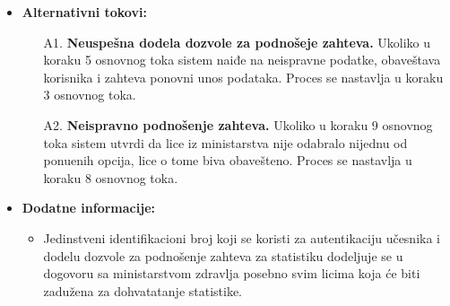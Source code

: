 \documentclass[titlepage]{article}
\begin{document}
\begin{itemize}
\begin{enumerate}
\begin{itemize}
                    \item Dohvatanje statistike o broju vakcinisanih Sputnik V vakcinom u odre\dj{}enom vremenskom periodu.
                    \item Dohvatanje statistike o broju vakcinisanih Sinopharm vakcinom u odre\dj{}enom vremenskom periodu.
                    \item Dohvatanje statistike o broju vakcinisanih Oxford/AstraZeneca vakcinom u odre\dj{}enom vremenskom periodu.
                    \item Dohvatanje statistike o broju testiranih na COVID-19 u odre\dj{}enom vremenskom periodu.
                    \item Dohvatanje statistike o broju osoba sa pozitivnim testom na \newline COVID-19 u odre\dj{}enom vremenskom periodu.
                    \item Dohvatanje informacija (vreme, identitet lica iz ministarstva) o prethodnim potra\v{z}ivanjima iz ministarstva zdravlja.
                \end{itemize}
    \item Sistem proverava da li je uspe\v{s}no izabrana neka od opcija.
    \item Sistem na osnovu izbora dostavlja statistiku licu iz ministartstva zdravlja.
    \item Informacije o vremenu i identitetu potra\v{z}ioca \v{c}uvaju se u sistemu.
 \end{enumerate}
 \item \textbf{Alternativni tokovi:}
 \begin{itemize}
            \item[A1.] \textbf{Neuspe\v{s}na dodela dozvole za podno\v{s}eje zahteva.} Ukoliko u koraku 5 osnovnog toka sistem naiđe na neispravne podatke, obaveštava korisnika i zahteva ponovni unos podataka. Proces se nastavlja u koraku 3 osnovnog toka.
            \item[A2.] \textbf{Neispravno podno\v{s}enje zahteva.} Ukoliko u koraku 9 osnovnog toka sistem utvrdi da lice iz ministarstva nije odabralo nijednu od ponu\dj{}enih opcija, lice o tome biva obave\v{s}teno. Proces se nastavlja u koraku 8 osnovnog toka. 
        \end{itemize}
 \item \textbf{Dodatne informacije:}
            \begin{itemize}
                \item Jedinstveni identifikacioni broj koji se koristi za autentikaciju u\v{c}esnika i dodelu dozvole za podno\v{s}enje zahteva za statistiku dodeljuje se u dogovoru sa ministarstvom zdravlja posebno svim licima koja \'{c}e biti  zadu\v{z}ena za dohvatatanje statistike.
            \end{itemize}

\end{itemize}
\end{document}
